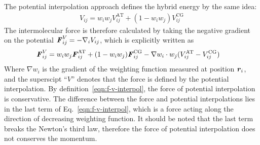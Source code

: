 \documentclass[epjST]{svjour}
\newcommand{\vect}[1]{\textbf{\textit{#1}}}
\newcommand{\AT}[0]{\textrm{AT}}
\newcommand{\CG}[0]{\textrm{CG}}
\newcommand{\moleidxone}[0]{i}
\newcommand{\moleidxtwo}[0]{j}
\begin{document}
The potential interpolation approach defines the hybrid energy by the same idea:
\begin{align}\label{eqn:v-v-interpol}
  {V}_{\moleidxone \moleidxtwo}=w_\moleidxone w_\moleidxtwo{V}_{\moleidxone\moleidxtwo}^{\AT}+(1-w_\moleidxone w_\moleidxtwo){V}^{\CG}_{\moleidxone\moleidxtwo} 
\end{align}
The intermolecular force is therefore calculated by taking the negative gradient on the potential ${\vect F}^V_{\moleidxone \moleidxtwo}= -\nabla_{\moleidxone}{V}_{\moleidxone \moleidxtwo}$,
which is explicitly written as
\begin{align}\label{eqn:f-v-interpol}
  {\vect F}^V_{\moleidxone \moleidxtwo}
  &=w_\moleidxone w_\moleidxtwo{\vect F}_{\moleidxone\moleidxtwo}^{\AT}+(1-w_\moleidxone w_\moleidxtwo){\vect F}^{\CG}_{\moleidxone\moleidxtwo}  - \nabla w_\moleidxone\cdot w_\moleidxtwo (V^\AT_{\moleidxone \moleidxtwo} - V^\CG_{\moleidxone \moleidxtwo})
\end{align}
Where $\nabla w_\moleidxone$ is the gradient of the weighting function measured at position $\vect r_\moleidxone$,
and the superscipt ``$V$'' denotes that the force is defined
by the potential interpolation.
By  definition~\eqref{eqn:f-v-interpol}, the force of potential interpolation is conservative. 
The difference between the force and potential
interpolations lies in the last term  of Eq.~\eqref{eqn:f-v-interpol}, which is a force
acting along the direction of decreasing weighting function.
It should be noted that
the last term breaks the Newton's third law, therefore the force of potential interpolation
does not conserves the momentum.
\end{document}
